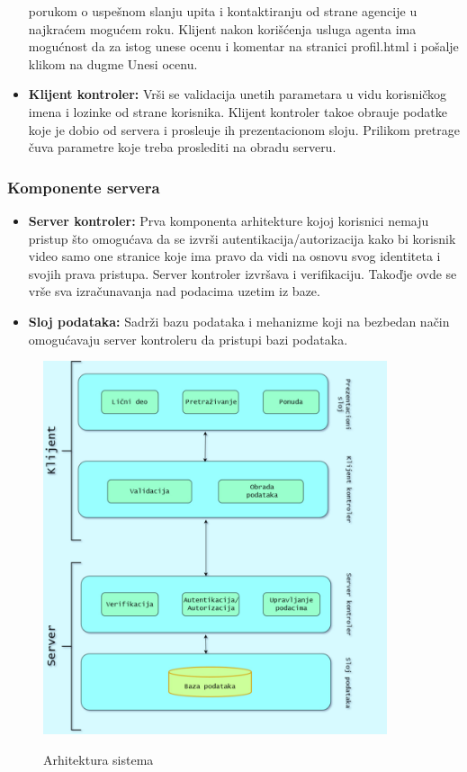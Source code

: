 \documentclass[20pt]{article}
\begin{document}
\begin{itemize}
porukom o uspe\v {s}nom slanju upita i kontaktiranju od strane agencije u najkra\' {c}em mogu\' {c}em roku. Klijent nakon kori\v {s}\' {c}enja usluga agenta ima mogu\' {c}nost da za istog unese ocenu i komentar na stranici profil.html i po\v {s}alje klikom na dugme Unesi ocenu. 
    \item \textbf{Klijent kontroler:} Vr\v {s}i se validacija unetih parametara u vidu korisni\v {c}kog imena i lozinke od strane korisnika. Klijent kontroler tako\dj e obra\dj uje podatke koje je dobio od servera i prosle\dj uje ih prezentacionom sloju. Prilikom pretrage \v {c}uva parametre koje treba proslediti na obradu serveru.
\end{itemize}
      
            
\subsubsection{\bfseries \Large Komponente servera }
\setlength{\parindent}{1cm}
\fontsize{13}{18} \selectfont       
\begin{itemize}
    \item \textbf{Server kontroler:} Prva komponenta arhitekture kojoj korisnici nemaju pristup \v {s}to omogu\' cava da se izvr\v {s}i autentikacija/autorizacija kako bi korisnik video samo one stranice koje ima pravo da vidi na osnovu svog identiteta i svojih prava pristupa. Server kontroler izvr\v {s}ava i verifikaciju. Tako\v {dj}e ovde se vr\v {s}e sva izra\v {c}unavanja nad podacima uzetim iz baze.
    \item \textbf{Sloj podataka:} Sadr\v {z}i bazu podataka i mehanizme koji na bezbedan na\v {c}in omogu\' cavaju server kontroleru da pristupi bazi podataka.
\end{itemize}

\newpage
\begin{figure}[h]
        \centering
        \includegraphics[width=0.9\textwidth,height=0.74\textheight]{Pictures/Arhitektura3.jpg}\\
        \caption{Arhitektura sistema}
        \label{fig:arhitekturaSistema}
\end{figure}
      
\end{document}
